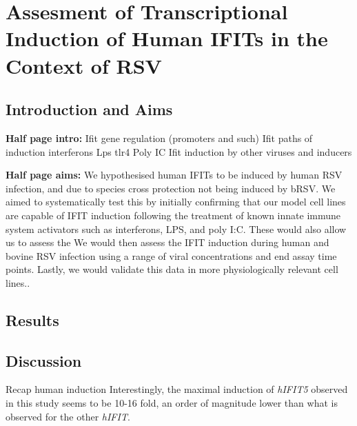 \chapter{Assesment of Transcriptional Induction of Human IFITs in the Context of RSV} \label{ch:Assesment of Transcriptional Induction of Human IFITs in the Context of RSV}
\section{Introduction and Aims} \label{sec:Introduction and Aims-Chapter 1}
\textbf{Half page intro:}
Ifit gene regulation (promoters and such) \newline
Ifit paths of induction \newline
interferons \newline
Lps tlr4 \newline
Poly IC \newline
Ifit induction by other viruses and inducers \newline

\lipsum[1-2]


\textbf{Half page aims:}
We hypothesised human IFITs to be induced by human RSV infection, and due to species cross protection not being induced by bRSV. We aimed to systematically test this by initially confirming that our model cell lines are capable of IFIT induction following the treatment of known innate immune system activators such as interferons, LPS, and poly I:C. These would also allow us to assess the  We would then assess the IFIT induction during human and bovine RSV infection using a range of viral concentrations and end assay time points. Lastly, we would validate this data in more physiologically relevant cell lines..

\lipsum[1]


\section{Results} \label{sec:Results-Chapter 1}



\section{Discussion} \label{sec:Discussion Chapter 1}
Recap human induction \newline
Interestingly, the maximal induction of \textit{hIFIT5} observed in this study seems to be 10-16 fold, an order of magnitude lower than what is observed for the other \textit{hIFIT}.





\lipsum[1-6]


